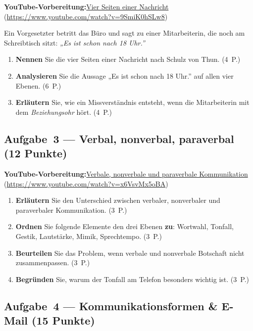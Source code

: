 \documentclass[11pt, a4paper]{article}
\begin{document}
\noindent\textbf{\color{bfwAccent}YouTube-Vorbereitung:}\enspace \href{https://www.youtube.com/watch?v=9SmiK0hSLw8}{Vier Seiten einer Nachricht} (\url{https://www.youtube.com/watch?v=9SmiK0hSLw8})

\medskip
Ein Vorgesetzter betritt das Büro und sagt zu einer Mitarbeiterin, die noch am Schreibtisch
sitzt: \emph{„Es ist schon nach 18 Uhr.”}

\begin{enumerate}[label=(\alph*)]
  \item \textbf{Nennen} Sie die vier Seiten einer Nachricht nach Schulz von Thun. \hfill (4~P.)
  \item \textbf{Analysieren} Sie die Aussage „Es ist schon nach 18 Uhr.” auf allen vier Ebenen. \hfill (6~P.)
  \item \textbf{Erläutern} Sie, wie ein Missverständnis entsteht, wenn die Mitarbeiterin mit dem \emph{Beziehungsohr} hört. \hfill (4~P.)
\end{enumerate}

\subsection*{Aufgabe~3 --- Verbal, nonverbal, paraverbal (12 Punkte)}

\noindent\textbf{\color{bfwAccent}YouTube-Vorbereitung:}\enspace \href{https://www.youtube.com/watch?v=x6VsvMx5oBA}{Verbale, nonverbale und paraverbale Kommunikation} (\url{https://www.youtube.com/watch?v=x6VsvMx5oBA})

\medskip
\begin{enumerate}[label=(\alph*)]
  \item \textbf{Erläutern} Sie den Unterschied zwischen verbaler, nonverbaler und paraverbaler Kommunikation. \hfill (3~P.)
  \item \textbf{Ordnen} Sie folgende Elemente den drei Ebenen \textbf{zu}: Wortwahl, Tonfall, Gestik, Lautstärke, Mimik, Sprechtempo. \hfill (3~P.)
  \item \textbf{Beurteilen} Sie das Problem, wenn verbale und nonverbale Botschaft nicht zusammenpassen. \hfill (3~P.)
  \item \textbf{Begründen} Sie, warum der Tonfall am Telefon besonders wichtig ist. \hfill (3~P.)
\end{enumerate}

\subsection*{Aufgabe~4 --- Kommunikationsformen \& E-Mail (15 Punkte)}
\end{document}
